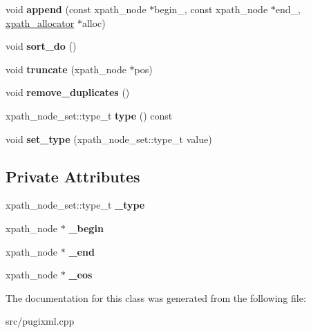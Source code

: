 \begin{DoxyCompactItemize}
void {\bfseries append} (const xpath\+\_\+node $\ast$begin\+\_\+, const xpath\+\_\+node $\ast$end\+\_\+, \hyperlink{classxpath__allocator}{xpath\+\_\+allocator} $\ast$alloc)
\item 
\mbox{\label{classxpath__node__set__raw_a5e46ee306afc24ea83f6c1181bba3600}} 
void {\bfseries sort\+\_\+do} ()
\item 
\mbox{\label{classxpath__node__set__raw_aba48d228f554065702f3e6d5059f701d}} 
void {\bfseries truncate} (xpath\+\_\+node $\ast$pos)
\item 
\mbox{\label{classxpath__node__set__raw_af82da6fa8d42f9dff9c55e7b93d96e26}} 
void {\bfseries remove\+\_\+duplicates} ()
\item 
\mbox{\label{classxpath__node__set__raw_a40f85691234070adc233cc2eac980fbf}} 
xpath\+\_\+node\+\_\+set\+::type\+\_\+t {\bfseries type} () const
\item 
\mbox{\label{classxpath__node__set__raw_ae73780271d772967f78ddd7b9376cdab}} 
void {\bfseries set\+\_\+type} (xpath\+\_\+node\+\_\+set\+::type\+\_\+t value)
\end{DoxyCompactItemize}
\subsection*{Private Attributes}
\begin{DoxyCompactItemize}
\item 
\mbox{\label{classxpath__node__set__raw_a00a164066aff1d6075631b2532ed9713}} 
xpath\+\_\+node\+\_\+set\+::type\+\_\+t {\bfseries \+\_\+type}
\item 
\mbox{\label{classxpath__node__set__raw_a8e6071473610e8340b07a64767ef68c0}} 
xpath\+\_\+node $\ast$ {\bfseries \+\_\+begin}
\item 
\mbox{\label{classxpath__node__set__raw_af8435774146a65edee6cf320dbb8930f}} 
xpath\+\_\+node $\ast$ {\bfseries \+\_\+end}
\item 
\mbox{\label{classxpath__node__set__raw_a886a925457f162fe38483da1d57b9b56}} 
xpath\+\_\+node $\ast$ {\bfseries \+\_\+eos}
\end{DoxyCompactItemize}


The documentation for this class was generated from the following file\+:\begin{DoxyCompactItemize}
\item 
src/pugixml.\+cpp\end{DoxyCompactItemize}
